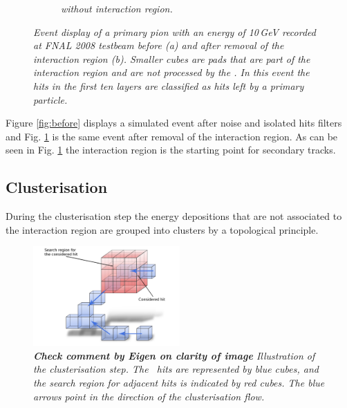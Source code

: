 \begin{figure}
\begin{subfigure}{0.5\textwidth}
		\caption{\label{fig:after} \sl without interaction region.}
	\end{subfigure}
	\caption{ \sl Event display of a primary pion with an energy of 10\,GeV recorded at FNAL 2008 testbeam before \textit{(a)} and after removal of the interaction region \textit{(b)}. Smaller cubes are pads that are part of the interaction region and are not processed by the \tfa . In this event the hits in the first ten layers are classified as hits left by a primary particle.}
	\label{fig:test}
\end{figure}

Figure \ref{fig:before} displays a simulated event after noise and isolated hits filters and Fig. \ref{fig:after} is the same event after removal of the interaction region. As can be seen in Fig. \ref{fig:after} the interaction region is the starting point for secondary tracks.



\subsection{Clusterisation}\label{sec:cluster}
During the clusterisation step the energy depositions that are not associated to the interaction region are grouped into clusters by a topological principle. %

\begin{figure}
	\centering
	\includegraphics[width=0.5\textwidth]{ECAL/graphics/demo-v2.png}
	\caption{\label{fig:democluster} \sl {\bf Check comment by Eigen on clarity of image} Illustration of the clusterisation step. The \ecal\ hits are represented by blue cubes, and the search region for adjacent hits is indicated by red cubes. The blue arrows point in the direction of the clusterisation flow. }
\end{figure}

